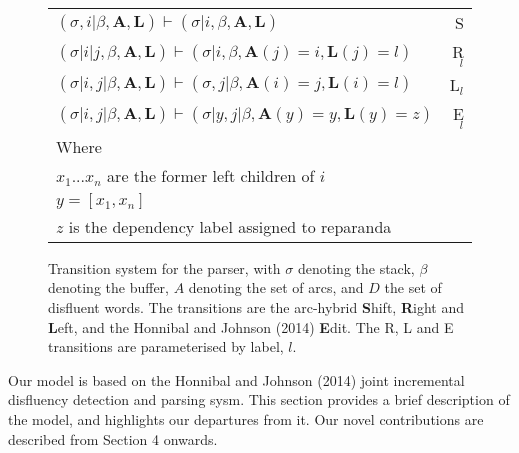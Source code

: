 \documentclass[11pt,letterpaper]{article}
\begin{document}
\begin{figure}
    \centering
    \small
    \begin{tabular}{lr}
        \hline
        $(\sigma, i | \beta, \mathbf{A}, \mathbf{L}) \vdash (\sigma | i, \beta, \mathbf{A}, \mathbf{L})$ & S \\
        $(\sigma | i | j, \beta, \mathbf{A}, \mathbf{L}) \vdash (\sigma | i, \beta, \mathbf{A}(j)=i, \mathbf{L}(j)=l)$ & R$_l$ \\ 
        $(\sigma | i, j | \beta, \mathbf{A}, \mathbf{L}) \vdash (\sigma, j | \beta, \mathbf{A}(i)=j, \mathbf{L}(i)=l)$ & L$_l$ \\
        $(\sigma | i, j | \beta, \mathbf{A}, \mathbf{L}) \vdash (\sigma | y, j | \beta, \mathbf{A}(y)=y, \mathbf{L}(y)=z)$ & E$_l$ \\
        Where \\
        $x_1...x_n$ are the former left children of $i$ \\
        $y = [x_1, x_n]$ \\
        $z$ is the dependency label assigned to reparanda \\
        \hline
\end{tabular}
\caption{\small Transition system for the parser, with $\sigma$ denoting the
    stack, $\beta$ denoting the buffer, $A$ denoting the set of arcs, and $D$ the
    set of disfluent words.  The transitions are the arc-hybrid \textbf{S}hift,
    \textbf{R}ight and \textbf{L}eft, and the Honnibal and Johnson (2014) \textbf{E}dit.
    The R, L and E transitions are parameterised by label, $l$.
\label{fig:trans}}
\vspace*{-3em}
\end{figure}
Our model is based on the Honnibal and Johnson (2014) joint incremental disfluency
detection and parsing sysm.  This section provides a brief description of
the model, and highlights our departures from it.
Our novel contributions are described from Section 4 onwards.
%
\end{document}

